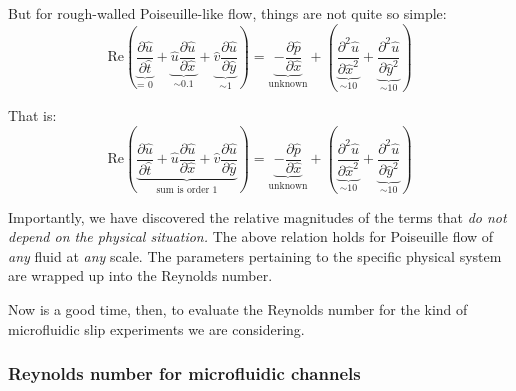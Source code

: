 \documentclass[12pt, a4paper, twoside, openright]{book}
\begin{document}
But for rough-walled Poiseuille-like flow, things are not quite so simple:
\begin{equation}
\mathrm{Re} \left( 
\underbrace{ \frac{\partial \hat{u}}{\partial \hat{t}} }_{\text{= 0}} +
\underbrace{ \hat{u} \frac{\partial \hat{u}}{\partial \hat{x}} }_{\sim 0.1} +
\underbrace{ \hat{v} \frac{\partial \hat{u}}{\partial \hat{y}} }_{\sim 1} 
\right) = 
\underbrace{ - \frac{\partial \hat{p}}{\partial \hat{x}} }_{\text{unknown}}
  + \left( 
\underbrace{ \frac{\partial^2 \hat{u}}{\partial \hat{x}^2} }_{\sim 10} + 
\underbrace{ \frac{\partial^2 \hat{u}}{\partial \hat{y}^2} }_{\sim 10} 
\right)
\end{equation}

That is:
\begin{equation}
\mathrm{Re} \left( 
\underbrace{ \frac{\partial \hat{u}}{\partial \hat{t}}  +
     \hat{u} \frac{\partial \hat{u}}{\partial \hat{x}}  +
     \hat{v} \frac{\partial \hat{u}}{\partial \hat{y}} }_{\text{sum is order 1}} 
\right) = 
\underbrace{ - \frac{\partial \hat{p}}{\partial \hat{x}} }_{\text{unknown}}
  + \left( 
\underbrace{ \frac{\partial^2 \hat{u}}{\partial \hat{x}^2} }_{\sim 10} + 
\underbrace{ \frac{\partial^2 \hat{u}}{\partial \hat{y}^2} }_{\sim 10} 
\right)
\end{equation}


Importantly, we have discovered the relative magnitudes of the terms that \emph{do not depend on the physical situation.}  The above relation holds for Poiseuille flow of \emph{any} fluid at \emph{any} scale.  The parameters pertaining to the specific physical system are wrapped up into the Reynolds number.

Now is a good time, then, to evaluate the Reynolds number for the kind of microfluidic slip experiments we are considering.

\subsubsection{Reynolds number for microfluidic channels}
\end{document}
